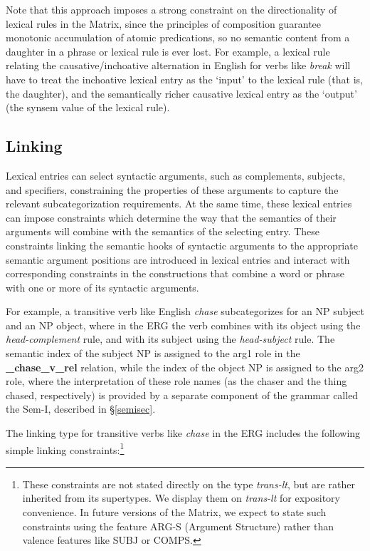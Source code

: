 \documentclass[12pt]{article}
\newcommand{\fn}{\footnote}
\begin{document}
Note that this approach imposes a strong constraint on the
directionality of lexical rules in the Matrix, since the principles of
composition guarantee monotonic accumulation of atomic predications,
so no semantic content from a daughter in a phrase or lexical rule is
ever lost.  For example, a lexical rule relating the
causative/inchoative alternation in English for verbs like {\it break}
will have to treat the inchoative lexical entry as the `input' to the
lexical rule (that is, the daughter), and the semantically richer
causative lexical entry as the `output' (the {\sc synsem} value of the
lexical rule).


\subsection{Linking}
\label{linksec}

Lexical entries can select syntactic arguments, such as complements, subjects,
and specifiers, constraining the properties of these arguments to capture the
relevant subcategorization requirements.  At the same time, these lexical
entries can impose constraints which determine the way that the semantics of 
their arguments will combine with the semantics of the selecting entry.
These constraints linking the semantic hooks of syntactic arguments to the
appropriate semantic argument positions are introduced in lexical entries
and interact with corresponding constraints in the constructions
that combine a word or phrase with one or more of its syntactic arguments.

For example, a transitive verb like English {\it chase} subcategorizes for an 
NP subject and an NP object, where in the ERG the verb combines with its 
object using the {\it head-complement} rule, and with its subject using the
{\it head-subject} rule.  The semantic index of the subject NP is assigned
to the {\sc arg1} role in the {\bf \_chase\_v\_rel} relation, while the index of
the object NP is assigned to the {\sc arg2} role, where the interpretation
of these role names (as the chaser and the thing chased, respectively) is
provided by a separate component of the grammar called the Sem-I, described
in \S\ref{semisec}.

The linking type for transitive verbs like {\it chase} in the ERG includes the 
following simple linking constraints:\fn{These \label{argsfn}constraints are 
not stated directly
on the type {\it trans-lt}, but are rather inherited from its supertypes.  We
display them on {\it trans-lt} for expository convenience.  In future versions 
of the Matrix,
we expect to state such constraints using the feature {\sc ARG-S} (Argument Structure) rather than valence features like SUBJ or COMPS.}
\end{document}

